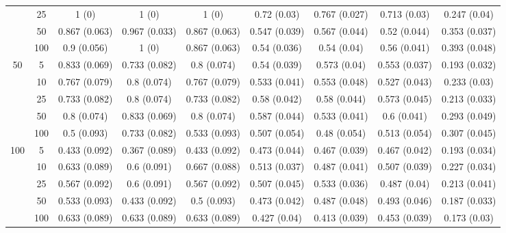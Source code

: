 \documentclass[10pt]{article}
\theoremstyle{definition}
\begin{document}
\begin{sidewaysfigure}
\begin{tabular}{cc|ccc|cccc}
    & 25  & 1 (0) & 1 (0) & 1 (0) & 0.72 (0.03) & 0.767 (0.027) & 0.713 (0.03) & 0.247 (0.04) \\ 
    & 50  & 0.867 (0.063) & 0.967 (0.033) & 0.867 (0.063) & 0.547 (0.039) & 0.567 (0.044) & 0.52 (0.044) & 0.353 (0.037) \\ 
    & 100  & 0.9 (0.056) & 1 (0) & 0.867 (0.063) & 0.54 (0.036) & 0.54 (0.04) & 0.56 (0.041) & 0.393 (0.048) \\[.3cm]  
   \multirow{5}{*}{50} & 5  & 0.833 (0.069) & 0.733 (0.082) & 0.8 (0.074) & 0.54 (0.039) & 0.573 (0.04) & 0.553 (0.037) & 0.193 (0.032) \\ 
    & 10  & 0.767 (0.079) & 0.8 (0.074) & 0.767 (0.079) & 0.533 (0.041) & 0.553 (0.048) & 0.527 (0.043) & 0.233 (0.03) \\ 
    & 25  & 0.733 (0.082) & 0.8 (0.074) & 0.733 (0.082) & 0.58 (0.042) & 0.58 (0.044) & 0.573 (0.045) & 0.213 (0.033) \\ 
    & 50  & 0.8 (0.074) & 0.833 (0.069) & 0.8 (0.074) & 0.587 (0.044) & 0.533 (0.041) & 0.6 (0.041) & 0.293 (0.049) \\ 
   & 100  & 0.5 (0.093) & 0.733 (0.082) & 0.533 (0.093) & 0.507 (0.054) & 0.48 (0.054) & 0.513 (0.054) & 0.307 (0.045) \\[.3cm]  
   \multirow{5}{*}{100} & 5  & 0.433 (0.092) & 0.367 (0.089) & 0.433 (0.092) & 0.473 (0.044) & 0.467 (0.039) & 0.467 (0.042) & 0.193 (0.034) \\ 
    & 10  & 0.633 (0.089) & 0.6 (0.091) & 0.667 (0.088) & 0.513 (0.037) & 0.487 (0.041) & 0.507 (0.039) & 0.227 (0.034) \\ 
    & 25  & 0.567 (0.092) & 0.6 (0.091) & 0.567 (0.092) & 0.507 (0.045) & 0.533 (0.036) & 0.487 (0.04) & 0.213 (0.041) \\ 
    & 50  & 0.533 (0.093) & 0.433 (0.092) & 0.5 (0.093) & 0.473 (0.042) & 0.487 (0.048) & 0.493 (0.046) & 0.187 (0.033) \\ 
    & 100  & 0.633 (0.089) & 0.633 (0.089) & 0.633 (0.089) & 0.427 (0.04) & 0.413 (0.039) & 0.453 (0.039) & 0.173 (0.03) \\ 
\end{tabular}
\end{sidewaysfigure}

\end{document}
